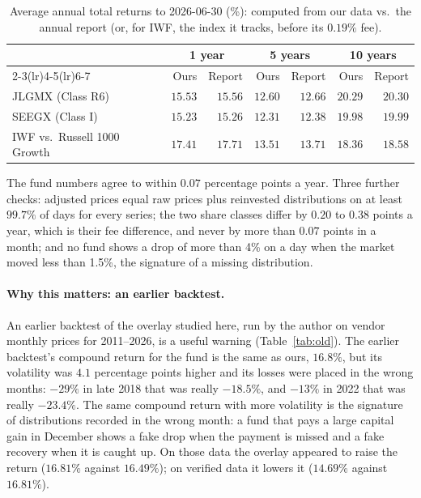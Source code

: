 \documentclass[11pt,a4paper]{article}
\begin{document}
\begin{table}[htbp]
\centering
\caption{Average annual total returns to 2026-06-30 (\%): computed from our data vs.\ the annual report (or,
for IWF, the index it tracks, before its $0.19\%$ fee).}
\label{tab:data}
\small
\begin{tabular}{@{}lrrrrrr@{}}
\toprule
& \multicolumn{2}{c}{1 year} & \multicolumn{2}{c}{5 years} & \multicolumn{2}{c}{10 years} \\
\cmidrule(lr){2-3}\cmidrule(lr){4-5}\cmidrule(lr){6-7}
& Ours & Report & Ours & Report & Ours & Report \\
\midrule
JLGMX (Class R6) & $15.53$ & $15.56$ & $12.60$ & $12.66$ & $20.29$ & $20.30$ \\
SEEGX (Class I) & $15.23$ & $15.26$ & $12.31$ & $12.38$ & $19.98$ & $19.99$ \\
IWF vs.\ Russell 1000 Growth & $17.41$ & $17.71$ & $13.51$ & $13.71$ & $18.36$ & $18.58$ \\
\bottomrule
\end{tabular}
\end{table}

The fund numbers agree to within $0.07$ percentage points a year. Three further checks: adjusted prices
equal raw prices plus reinvested distributions on at least $99.7\%$ of days for every series; the two share
classes differ by $0.20$ to $0.38$ points a year, which is their fee difference, and never by more than
$0.07$ points in a month; and no fund shows a drop of more than 4\% on a day when the market moved
less than 1.5\%, the signature of a missing distribution.

\paragraph{Why this matters: an earlier backtest.} An earlier backtest of the overlay studied here, run by the
author on vendor monthly prices for 2011--2026, is a useful warning (Table~\ref{tab:old}). The earlier backtest's compound return for the fund is the same as ours, $16.8\%$, but its volatility was $4.1$ percentage
points higher and its losses were placed in the wrong months: $-29\%$ in late 2018 that was really $-18.5\%$,
and $-13\%$ in 2022 that was really $-23.4\%$. The same compound return with more volatility is the signature
of distributions recorded in the wrong month: a fund that pays a large capital gain in December shows a fake
drop when the payment is missed and a fake recovery when it is caught up. On those data the overlay appeared
to raise the return ($16.81\%$ against $16.49\%$); on verified data it lowers it
($14.69\%$ against $16.81\%$).
\end{document}

